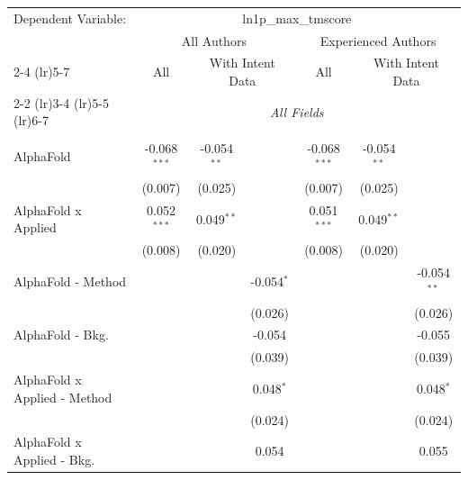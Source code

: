 \begingroup
\centering
\begin{tabular}{lcccccc}
   \tabularnewline \midrule \midrule
   Dependent Variable: & \multicolumn{6}{c}{ln1p\_max\_tmscore}\\
 & \multicolumn{3}{c}{All Authors} & \multicolumn{3}{c}{Experienced Authors} \\
\cmidrule(lr){2-4} \cmidrule(lr){5-7}
 & \multicolumn{1}{c}{All} & \multicolumn{2}{c}{With Intent Data} & \multicolumn{1}{c}{All} & \multicolumn{2}{c}{With Intent Data} \\
\cmidrule(lr){2-2} \cmidrule(lr){3-4} \cmidrule(lr){5-5} \cmidrule(lr){6-7}
 & \multicolumn{6}{c}{\textit{All Fields}} \\ \\
   AlphaFold                      & -0.068$^{***}$ & -0.054$^{**}$  &                & -0.068$^{***}$ & -0.054$^{**}$  &   \\   
                                  & (0.007)        & (0.025)        &                & (0.007)        & (0.025)        &   \\   
   AlphaFold x Applied            & 0.052$^{***}$  & 0.049$^{**}$   &                & 0.051$^{***}$  & 0.049$^{**}$   &   \\   
                                  & (0.008)        & (0.020)        &                & (0.008)        & (0.020)        &   \\   
   AlphaFold - Method             &                &                & -0.054$^{*}$   &                &                & -0.054$^{**}$\\   
                                  &                &                & (0.026)        &                &                & (0.026)\\   
   AlphaFold - Bkg.               &                &                & -0.054         &                &                & -0.055\\   
                                  &                &                & (0.039)        &                &                & (0.039)\\   
   AlphaFold x Applied - Method   &                &                & 0.048$^{*}$    &                &                & 0.048$^{*}$\\   
                                  &                &                & (0.024)        &                &                & (0.024)\\   
   AlphaFold x Applied - Bkg.     &                &                & 0.054          &                &                & 0.055\\   

\end{tabular}
